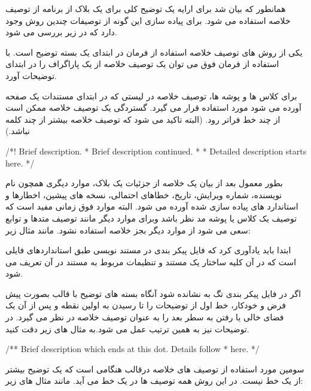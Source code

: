همانطور که بیان شد برای ارایه یک توضیح کلی برای یک بلاک از برنامه از توصیف خلاصه
استفاده می شود. برای پیاده سازی این گونه از توصیفات چندین روش وجود دارد که در
زیر بررسی می شود.

یکی از روش های توصیف خلاصه استفاده از فرمان  در ابتدای
یک بسته توضیح است. با استفاده از فرمان فوق می توان یک توصیف خلاصه از یک پاراگراف
را در ابتدای توضیحات آورد.

برای کلاس ها و پوشه ها، توصیف خلاصه در لیستی که در ابتدای مستندات یک صفحه آورده
می شود مورد استفاده قرار می گیرد. گستردگی یک توصیف خلاصه ممکن است از چند خط
فراتر رود. (البته تاکید می شود که توصیف خلاصه بیشتر از چند کلمه نباشد.)


\begin{C++}
/*! \brief Brief description.
 *         Brief description continued.
 *
 *  Detailed description starts here.
 */
\end{C++}

بطور معمول بعد از بیان یک خلاصه از جزئیات یک بلاک، موارد دیگری همچون نام
نویسنده، شماره ویرایش، تاریخ، خطاهای احتمالی، نسخه های پیشین، اخطارها و
استاندارد های پیاده سازی شده آورده می شود. البته موارد فوق زمانی مفید است که
توصیف یک کلاس یا پوشه مد نظر باشد وبرای موارد دیگر مانند توصیف متدها و توابع سعی
می شود از موارد دیگر بجز خلاصه استفاده نشود. مانند مثال زیر:


ابتدا باید یادآوری کرد که فایل پیکر بندی در مستند نویسی طبق استانداردهای
 فایلی است که در آن کلیه ساختار یک مستند و تنظیمات مربوط به مستند در
آن تعریف می شود.

اگر در فایل پیکر بندی تگ   به  نشانده شود آنگاه
بسته های توضیح با قالب  بصورت پیش فرض و خودکار، خط اول از توضیحات را
تا رسیدن به اولین نقطه و پس از آن یک فضای خالی یا رفتن به سطر بعد را به عنوان
توصیف خلاصه در نظر می گیرد.
در توضیحات  نیز به همین ترتیب عمل می شود.به مثال های زیر دقت کنید.

\begin{C++}
/** Brief description which ends at this dot. Details follow
 *  here.
 */
\end{C++}

سومین مورد استفاده از توصیف های خلاصه درقالب  هنگامی است که یک
توضیح بیشتر از یک خط نیست. در این روش همه توصیف ها در یک خط می آید. مانند مثال
های زیر:

